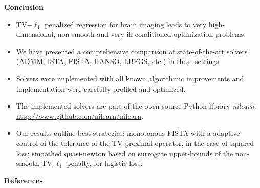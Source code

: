 \documentclass[french]{STIC_poster}
\begin{document}
\begin{frame}[t]
\begin{sxbox}[\textwidth]{\textbf{Conclusion}}
\begin{itemize}
\item TV$-\ell_{1}$ penalized regression for brain imaging leads to
very high-dimensional, non-smooth and very ill-conditioned optimization
problems.
\item We have presented a comprehensive comparison of state-of-the-art
solvers (ADMM, ISTA, FISTA, HANSO, LBFGS, etc.) in these settings.
\item Solvers were implemented with all known
algorithmic improvements and implementation were carefully profiled and
optimized.
\item The implemented solvers are part of the open-source Python library \textit{nilearn}: \url{http://www.github.com/nilearn/nilearn}.
\item Our results outline best strategies: monotonous FISTA with
a adaptive control of the tolerance of the TV proximal operator, in the case of squared loss; smoothed quasi-newton based on surrogate upper-bounds of the non-smooth TV-$\ell_{1}$ penalty, for
logistic loss.
\end{itemize}
\end{sxbox}


\begin{nbox}[\textwidth]{\textbf{References}}

\end{nbox}

\end{frame}
\end{document}
